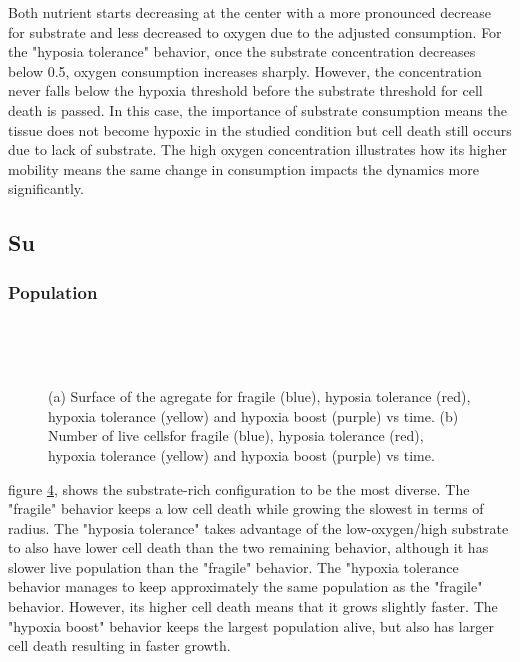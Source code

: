 \documentclass[11pt,a4paper]{article}
\begin{document}
Both nutrient starts decreasing at the center with a more pronounced decrease for substrate and less decreased to oxygen due to the adjusted consumption. For the "hyposia tolerance" behavior, once the substrate concentration decreases below 0.5, oxygen consumption increases sharply. However, the concentration never falls below the hypoxia threshold before the substrate threshold for cell death is passed. In this case, the importance of substrate consumption means the tissue does not become hypoxic in the studied condition but cell death still occurs due to lack of substrate. The high oxygen concentration illustrates how its higher mobility means the same change in consumption impacts the dynamics more significantly.\\


\subsection{Su}
\subsubsection{Population}
\begin{figure}[h]
\begin{subfigure}{0.32\textwidth}
	\centering
	
	\caption{ \label{OS_live_Ox}}
\end{subfigure}
~~
\begin{subfigure}{0.32\textwidth}
	\centering
	
	\caption{\label{OS_Rad_Ox}}
\end{subfigure}
~~
\begin{subfigure}{0.32\textwidth}
	\centering
	
	\caption{\label{OS_dead_Ox}}
\end{subfigure}
\caption{(a) Surface of the agregate for fragile (blue), hyposia tolerance (red), hypoxia tolerance (yellow) and hypoxia boost (purple) vs time. (b) Number of live cellsfor fragile (blue), hyposia tolerance (red), hypoxia tolerance (yellow) and hypoxia boost (purple) vs time. \label{OS_numbers_Ox}}
\end{figure}

figure \ref{OS_numbers_Ox}, shows the substrate-rich configuration to be the most diverse. The "fragile" behavior keeps a low cell death while growing the slowest in terms of radius. The "hyposia tolerance" takes advantage of the low-oxygen/high substrate to also have lower cell death than the two remaining behavior, although it has slower live population than the "fragile" behavior. The "hypoxia tolerance behavior manages to keep approximately the same population as the "fragile" behavior. However, its higher cell death means that it grows slightly faster. The "hypoxia boost" behavior keeps the largest population alive, but also has larger cell death resulting in faster growth.\\
\end{document}
